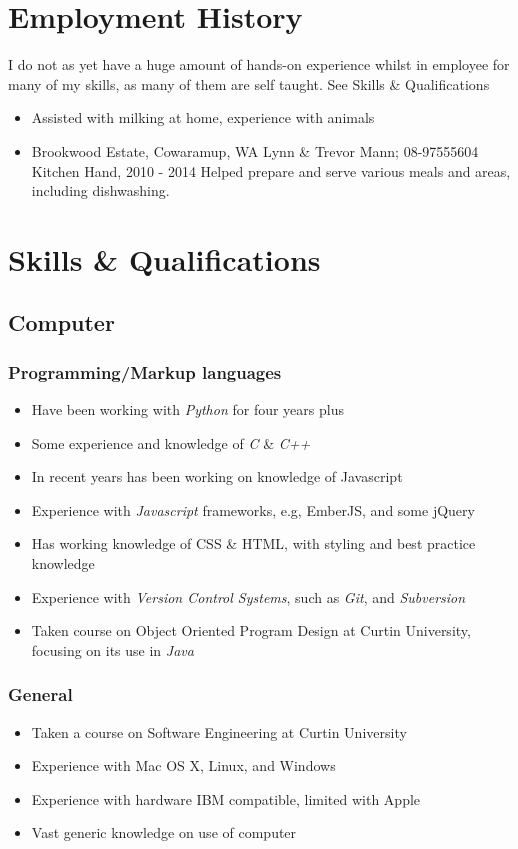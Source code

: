 \documentclass{article}
\begin{document}
\section{Employment History}
  I do not as yet have a huge amount of hands-on experience whilst in employee
  for many of my skills, as many of them are self taught. See Skills \& Qualifications

  \begin{itemize}
    \item{Assisted with milking at home, experience with animals}
    \item{
      Brookwood Estate, Cowaramup, WA
      Lynn \& Trevor Mann; 08-97555604
      Kitchen Hand, 2010 - 2014
      Helped prepare and serve various meals and areas, including dishwashing.
    }
  \end{itemize}

\section{Skills \& Qualifications}
  \subsection{Computer}
    \subsubsection{Programming/Markup languages}
    \begin{itemize}
      \item{Have been working with \emph{Python} for four years plus}
      \item{Some experience and knowledge of \emph{C} \& \emph{C++}}
      \item{In recent years has been working on knowledge of Javascript}
      \item{Experience with \emph{Javascript} frameworks, e.g, EmberJS, and some jQuery}
      \item{Has working knowledge of CSS \& HTML, with styling and best practice knowledge}
      \item{Experience with \emph{Version Control Systems}, such as \emph{Git}, and \emph{Subversion}}
      \item{Taken course on Object Oriented Program Design at Curtin University, focusing on its use in \emph{Java}}
    \end{itemize}

    \subsubsection{General}
      \begin{itemize}
        \item{Taken a course on Software Engineering at Curtin University}
        \item{Experience with Mac OS X, Linux, and Windows}
        \item{Experience with hardware IBM compatible, limited with Apple}
        \item{Vast generic knowledge on use of computer}
      \end{itemize}
\end{document}
